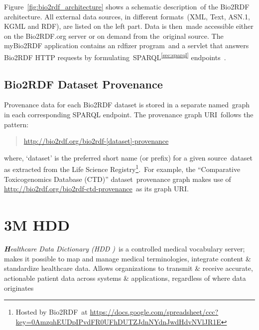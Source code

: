 \documentclass[DIV=calc, paper=a4, fontsize=12pt, onecolumn]{scrartcl}	 %
\newcommand{\initial}[1]{ %
\lettrine[lines=3,lhang=0.3,nindent=0em,slope=0em]{
\color{DarkBlue}
{\textbf{\textit{#1}}}}{}}
\begin{document}
  \noindent Figure~\ref{fig:bio2rdf_architecture} shows a schematic description\
  of the Bio2RDF architecture. All external data sources, in different formats\
  (XML, Text, ASN.1, KGML and RDF), are listed on the left part. Data is then\
  made accessible either on the Bio2RDF.org server or on demand from the\
  original source. The myBio2RDF application contains an rdfizer program\
  and a servlet that answers Bio2RDF HTTP requests by formulating\
  SPARQL\textsuperscript{\ref{sec:sparql}} endpoints~\cite{callahan_bio2rdf_2013}.\\
  
  \subsection{Bio2RDF Dataset Provenance}
  Provenance data for each Bio2RDF dataset is stored in a separate named\
  graph in each corresponding SPARQL endpoint. The provenance graph URI\
  follows the pattern:
  \begin{quote}
    \url{http://bio2rdf.org/bio2rdf-[dataset]-provenance}    
  \end{quote}

  \noindent where, `dataset' is the preferred short name (or prefix) for a given source\
  dataset as extracted from the Life Science Registry\footnote{Hosted by Bio2RDF\
  at \url{https://docs.google.com/spreadsheet/ccc?key=0AmzqhEUDpIPvdFR0UFhDUTZJdnNYdnJwdHdvNVlJR1E}}.\
  For example, the ``Comparative Toxicogenomics Database (CTD)'' dataset\
  provenance graph makes use of \url{http://bio2rdf.org/bio2rdf-ctd-provenance}\
  as its graph URI.


\section[3M\textsuperscript{\texttrademark} Healthcare Data Dictionary (HDD)]
{3M HDD\textsuperscript{\texttrademark}}
  \label{sec:hdd}
  
  \initial{H}\textit{ealthcare Data Dictionary (HDD )}\
 is a controlled medical vocabulary server; makes it possible to map and manage medical terminologies, integrate content \& standardize healthcare data. Allows organizations to transmit \& receive accurate, actionable patient data across systems \& applications, regardless of where data originates%
  
\end{document}
